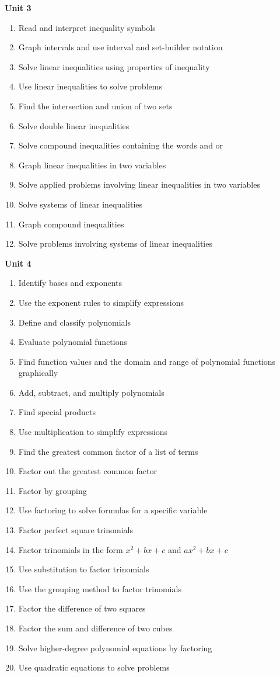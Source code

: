 \documentclass[10pt]{article}
\newenvironment{alphalist}{
\begin{enumerate}[label=(\arabic*),widest=107 ,leftmargin=25pt, itemsep=0pt]}
{\end{enumerate}}
\begin{document}
\noindent \textbf{Unit 3}
\begin{alphalist}
    \item Read and interpret inequality symbols
    \item Graph intervals and use interval and set-builder notation
    \item Solve linear inequalities using properties of inequality
    \item Use linear inequalities to solve problems
    \item Find the intersection and union of two sets
    \item Solve double linear inequalities
    \item Solve compound inequalities containing the words and or
    \item Graph linear inequalities in two variables
    \item Solve applied problems involving linear inequalities in two variables
    \item Solve systems of linear inequalities
    \item Graph compound inequalities
    \item Solve problems involving systems of linear inequalities
\end{alphalist}
\noindent \textbf{Unit 4}
\begin{alphalist}
    \item Identify bases and exponents
    \item Use the exponent rules to simplify expressions
    \item Define and classify polynomials
    \item Evaluate polynomial functions
    \item Find function values and the domain and range of polynomial functions graphically
    \item Add, subtract, and multiply polynomials
    \item Find special products
    \item Use multiplication to simplify expressions
    \item Find the greatest common factor of a list of terms
    \item Factor out the greatest common factor
    \item Factor by grouping
    \item Use factoring to solve formulas for a specific variable
    \item Factor perfect square trinomials
    \item Factor trinomials in the form $x^2 + bx + c$ and $ax^2 + bx + c$
    \item Use substitution to factor trinomials
    \item Use the grouping method to factor trinomials
    \item Factor the difference of two squares
    \item Factor the sum and difference of two cubes
    \item Solve higher-degree polynomial equations by factoring
    \item Use quadratic equations to solve problems
\end{alphalist}
 
\end{document}
